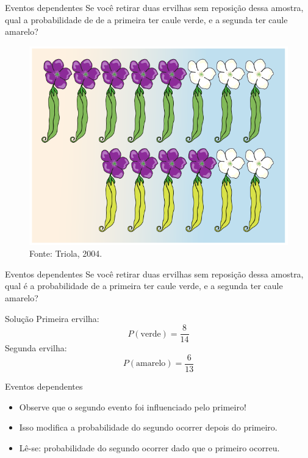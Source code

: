 \documentclass{beamer}
\begin{document}
\begin{frame}{Eventos dependentes}
  Se você retirar duas ervilhas \alert{sem reposição} dessa amostra,
  qual a probabilidade de de a primeira ter caule verde, e a segunda
  ter caule amarelo?
  \begin{figure}
    \centering
    \includegraphics[height=0.5\textheight]{Prob_I/ervilhas-genetica}
    \caption{Fonte: Triola, 2004.}
  \end{figure}
\end{frame}

\begin{frame}{Eventos dependentes}
  Se você retirar duas ervilhas \alert{sem reposição} dessa amostra,
  qual é a probabilidade de a primeira ter caule verde, e a segunda
  ter caule amarelo?  
\bigskip
\bigskip
\bigskip
  \begin{block}{Solução}
    Primeira ervilha:
    \begin{displaymath}
      P(\text{verde}) = \frac{8}{14}
    \end{displaymath}
    Segunda ervilha:
    \begin{displaymath}
      P(\text{amarelo}) = \frac{6}{13}
    \end{displaymath}
  \end{block}
\end{frame}

\begin{frame}{Eventos dependentes}
  \begin{itemize}
  \item Observe que o segundo evento foi influenciado pelo primeiro!
  \item Isso modifica a probabilidade do segundo ocorrer
    \alert{depois} do primeiro.
  \item Lê-se: probabilidade do segundo ocorrer \alert{dado} que o
    primeiro ocorreu.
  \end{itemize}
\end{frame}
\end{document}
